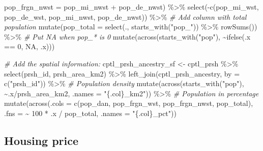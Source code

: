 \documentclass[
  12pt,
]{article}
\newenvironment{Shaded}{\begin{snugshade}}{\end{snugshade}}
\newcommand{\AttributeTok}[1]{\textcolor[rgb]{0.77,0.63,0.00}{#1}}
\newcommand{\CommentTok}[1]{\textcolor[rgb]{0.56,0.35,0.01}{\textit{#1}}}
\newcommand{\ConstantTok}[1]{\textcolor[rgb]{0.00,0.00,0.00}{#1}}
\newcommand{\DecValTok}[1]{\textcolor[rgb]{0.00,0.00,0.81}{#1}}
\newcommand{\FunctionTok}[1]{\textcolor[rgb]{0.00,0.00,0.00}{#1}}
\newcommand{\NormalTok}[1]{#1}
\newcommand{\OtherTok}[1]{\textcolor[rgb]{0.56,0.35,0.01}{#1}}
\newcommand{\SpecialCharTok}[1]{\textcolor[rgb]{0.00,0.00,0.00}{#1}}
\newcommand{\StringTok}[1]{\textcolor[rgb]{0.31,0.60,0.02}{#1}}
\begin{document}
\begin{Shaded}
\begin{Highlighting}[]
         \AttributeTok{pop\_frgn\_nwst =}\NormalTok{ pop\_mi\_nwst }\SpecialCharTok{+}\NormalTok{ pop\_de\_nwst) }\SpecialCharTok{\%\textgreater{}\%} 
  \FunctionTok{select}\NormalTok{(}\SpecialCharTok{{-}}\FunctionTok{c}\NormalTok{(pop\_mi\_wst, pop\_de\_wst, pop\_mi\_nwst, pop\_de\_nwst)) }\SpecialCharTok{\%\textgreater{}\%} 
  \CommentTok{\# Add column with total population}
  \FunctionTok{mutate}\NormalTok{(}\AttributeTok{pop\_total =} \FunctionTok{select}\NormalTok{(., }\FunctionTok{starts\_with}\NormalTok{(}\StringTok{"pop\_"}\NormalTok{)) }\SpecialCharTok{\%\textgreater{}\%} \FunctionTok{rowSums}\NormalTok{()) }\SpecialCharTok{\%\textgreater{}\%} 
  \CommentTok{\# Put NA when pop\_* is 0}
  \FunctionTok{mutate}\NormalTok{(}\FunctionTok{across}\NormalTok{(}\FunctionTok{starts\_with}\NormalTok{(}\StringTok{"pop"}\NormalTok{), }\SpecialCharTok{\textasciitilde{}}\FunctionTok{ifelse}\NormalTok{(.x }\SpecialCharTok{==} \DecValTok{0}\NormalTok{, }\ConstantTok{NA}\NormalTok{, .x)))}

\CommentTok{\# Add the spatial information:}
\NormalTok{cptl\_prsh\_ancestry\_sf }\OtherTok{\textless{}{-}}\NormalTok{ cptl\_prsh }\SpecialCharTok{\%\textgreater{}\%}
  \FunctionTok{select}\NormalTok{(prsh\_id, prsh\_area\_km2) }\SpecialCharTok{\%\textgreater{}\%} 
  \FunctionTok{left\_join}\NormalTok{(cptl\_prsh\_ancestry, }\AttributeTok{by =} \FunctionTok{c}\NormalTok{(}\StringTok{"prsh\_id"}\NormalTok{)) }\SpecialCharTok{\%\textgreater{}\%} 
  \CommentTok{\# Population density}
  \FunctionTok{mutate}\NormalTok{(}\FunctionTok{across}\NormalTok{(}\FunctionTok{starts\_with}\NormalTok{(}\StringTok{"pop"}\NormalTok{), }\SpecialCharTok{\textasciitilde{}}\NormalTok{.x}\SpecialCharTok{/}\NormalTok{prsh\_area\_km2, }\AttributeTok{.names =} \StringTok{"\{.col\}\_km2"}\NormalTok{)) }\SpecialCharTok{\%\textgreater{}\%} 
  \CommentTok{\# Population in percentage   }
  \FunctionTok{mutate}\NormalTok{(}\FunctionTok{across}\NormalTok{(}\AttributeTok{.cols =} \FunctionTok{c}\NormalTok{(pop\_dan, pop\_frgn\_wst, pop\_frgn\_nwst, pop\_total),}
                \AttributeTok{.fns =} \SpecialCharTok{\textasciitilde{}} \DecValTok{100} \SpecialCharTok{*}\NormalTok{ .x }\SpecialCharTok{/}\NormalTok{ pop\_total,}
                \AttributeTok{.names =} \StringTok{"\{.col\}\_pct"}\NormalTok{)) }
\end{Highlighting}
\end{Shaded}

\hypertarget{housing-price}{%
\subsection{Housing price}\label{housing-price}}
\end{document}
